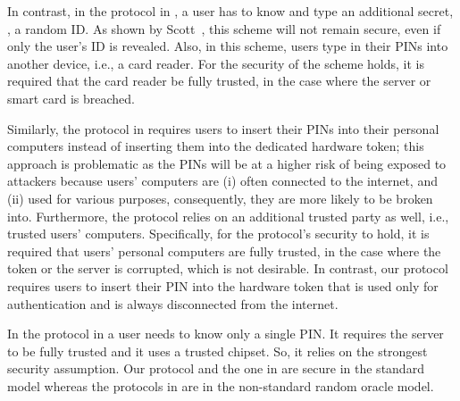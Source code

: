  In contrast, in the protocol in \cite{WangW18}, a user has to know and type an additional secret, \ie, a random ID. As shown by Scott~\cite{Scott12a}, this scheme will not remain secure, even if only the user's ID is revealed. Also, in this scheme, users type in their PINs into another device, i.e., a card reader. For the security of the scheme holds, it is required that the card reader be fully trusted, in the case where the server or smart card is breached. 
 
  
   Similarly, the protocol in \cite{JareckiJKSS21} requires users to insert their PINs into their personal computers instead of inserting them into the dedicated hardware token; this approach is problematic as the PINs will be at a higher risk of being exposed to attackers because users' computers are (i) often connected to the internet, and (ii) used for various purposes, consequently, they are more likely to be broken into. Furthermore, the protocol relies on an additional trusted party as well, i.e., trusted users' computers. Specifically, for the protocol's security to hold, it is required that users' personal computers are fully trusted, in the case where the token or the server is corrupted, which is not desirable. In contrast, our protocol requires users to insert their PIN into the hardware token that is used only for authentication and is always disconnected from the internet. 
 
 In the protocol in \cite{MatsuoMY11} a user needs to know only a single PIN. It requires the server to be fully trusted and it uses a trusted chipset. So, it relies on the strongest security assumption. 
Our protocol and the one in \cite{MatsuoMY11} are secure in the standard model whereas the protocols in \cite{WangW18,JareckiJKSS21} are in the non-standard random oracle model. 

